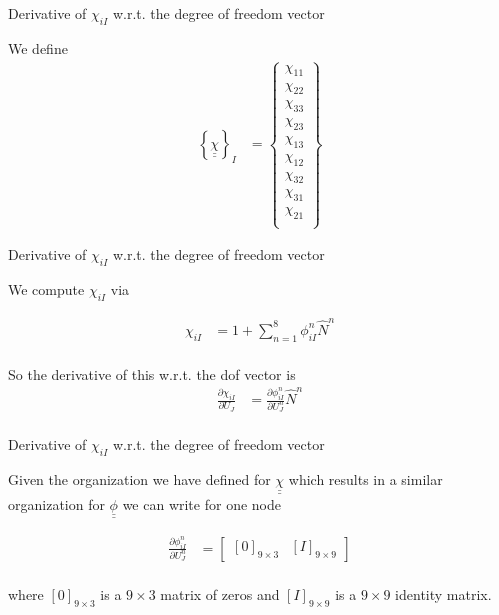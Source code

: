 \documentclass[11pt]{beamer}
\newcommand{\TEN}[1]{\underline{\underline{#1}}}
\begin{document}
\begin{frame}{Derivative of $\chi_{iI}$ w.r.t. the degree of freedom vector}

We define
\begin{align*}
\left\{\TEN{\chi}\right\}_I &= \left\{\begin{array}{c}
\chi_{11}\\
\chi_{22}\\
\chi_{33}\\
\chi_{23}\\
\chi_{13}\\
\chi_{12}\\
\chi_{32}\\
\chi_{31}\\
\chi_{21}\\
\end{array}\right\}
\end{align*}

\end{frame}

\begin{frame}{Derivative of $\chi_{iI}$ w.r.t. the degree of freedom vector}

We compute $\chi_{iI}$ via

\begin{align*}
\chi_{iI} &= 1+\sum_{n=1}^8 \phi_{iI}^n \hat{N}^n\\
\end{align*}

So the derivative of this w.r.t. the dof vector is
\begin{align*}
\frac{\partial \chi_{iI}}{\partial U_J} &= \frac{\partial \phi_{iI}^n}{\partial U_{J}^n}\hat{N}^n\\
\end{align*}


\end{frame}

\begin{frame}{Derivative of $\chi_{iI}$ w.r.t. the degree of freedom vector}

Given the organization we have defined for $\TEN{\chi}$ which results in a similar organization for $\TEN{\phi}$ we can write for one node

\begin{align*}
\frac{\partial \phi_{iI}^n}{\partial U_{J}^n} &= \left[\begin{array}{cc}
\left[0\right]_{9\times 3} & \left[I\right]_{9 \times 9}
\end{array} \right]\\
\end{align*}

where $[0]_{9 \times 3}$ is a $9 \times 3$ matrix of zeros and $[I]_{9 \times 9}$ is a $9 \times 9$ identity matrix.

\end{frame}
\end{document}
